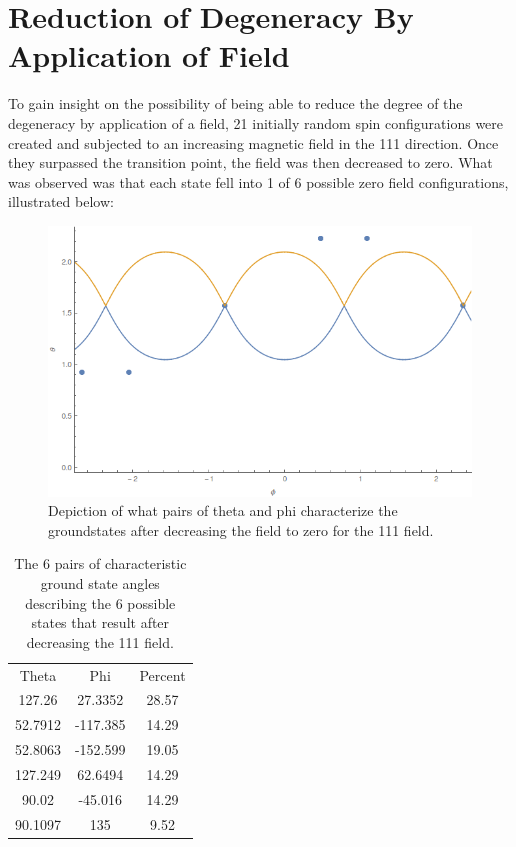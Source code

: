 \documentclass{article}
\begin{document}
\section{Reduction of Degeneracy By Application of Field}
To gain insight on the possibility of being able to reduce the degree of the degeneracy by application
of a field, 21 initially random spin configurations were created and subjected to an increasing magnetic
field in the 111 direction. Once they surpassed the transition point, the field was then decreased to zero. 
What was observed was that each state fell into 1 of 6 possible zero field configurations, illustrated below:
\begin{figure}[ht]
\centering
 \includegraphics[scale=0.5]{CollapsedDegeneracy.png}
 \caption{Depiction of what pairs of theta and phi characterize the groundstates after decreasing the field to zero for 
 the 111 field.}
\end{figure}

\begin{center}
\begin{table}[h]
\centering
\begin{tabular}{||c|c|c||}
\hline
 Theta & Phi & Percent \\ 
 127.26 & 27.3352 & 28.57\\  
 52.7912 & -117.385 & 14.29 \\  
 52.8063 & -152.599 & 19.05 \\  
 127.249 & 62.6494 & 14.29 \\  
 90.02 & -45.016 & 14.29 \\  
 90.1097 & 135 & 9.52   
\end{tabular}
\caption{The 6 pairs of characteristic ground state angles describing the 6 possible states that result after
decreasing the 111 field.}
\end{table}
\end{center}
\end{document}
